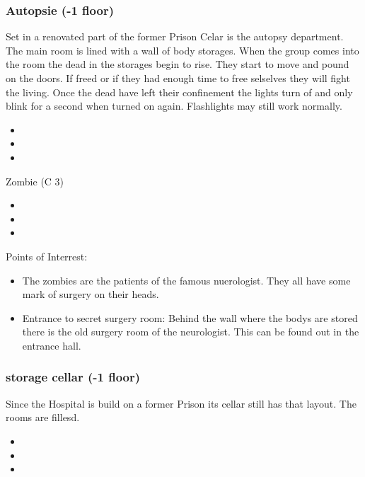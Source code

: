 \documentclass[11pt]{article}
\begin{document}
{\subsubsection{Autopsie (-1 floor)}
\label{sec:org7b50521}
Set in a renovated part of the former Prison Celar is the autopsy department. The main room is lined with a wall of body storages.
When the group comes into the room the dead in the storages begin to rise. They start to move and pound on the doors. If freed or if they had enough time to free selselves they will fight the living. Once the dead have left their confinement the lights turn of and only blink for a second when turned on again. Flashlights may still work normally.

\begin{itemize}
\item {}
\item {}
\item {}
\end{itemize}

Zombie (C 3)
\begin{itemize}
\item {}
\item {}
\item {}
\end{itemize}

Points of Interrest:
\begin{itemize}
\item The zombies are the patients of the famous nuerologist. They all have some mark of surgery on their heads.
\item Entrance to secret surgery room: Behind the wall where the bodys are stored there is the old surgery room of the neurologist. This can be found out in the entrance hall.
\end{itemize}
\subsubsection{storage cellar (-1 floor)}
\label{sec:org0f9bcae}
Since the Hospital is build on a former Prison its cellar still has that layout. The rooms are fillesd.

\begin{itemize}
\item {}
\item {}
\item {}
\end{itemize}

}
\end{document}
